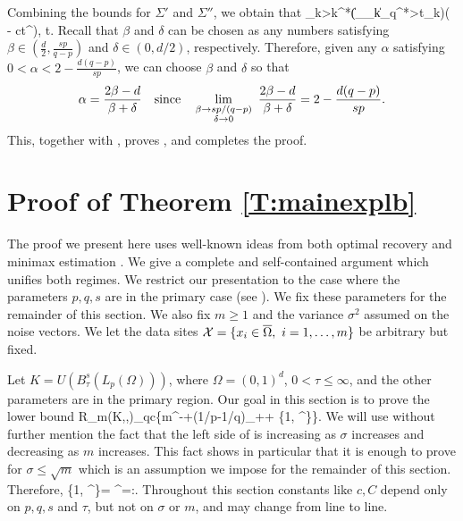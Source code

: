 Combining the bounds 
 for $\Sigma'$ and $\Sigma''$, we obtain that 
\be
\label{sigma2}
\sum_{k>k^*}(\|\eta_{\lambda_k}\|_q^*>t_k\e)( - ct^{}), \quad t.
\ee
Recall that $\beta$ and $\delta$ can be chosen as any numbers satisfying 
$\beta\in (\frac{d}{2},\frac{sp}{q-p})$ and  
  $\delta\in (0,d/2)$, respectively.    Therefore, given any 
 $\alpha$ satisfying
 $0<\alpha<2-\frac{d(q-p)}{sp}$, we   can choose $\beta$ and 
$\delta$ so that 
\begin{equation}
 \alpha= \frac{2\beta  -d}{\beta+\delta}%
 \quad 
 \hbox{since}
 \quad 
 \lim_{\substack{\beta\to sp/(q-p)\\\delta\to 0}}\,\, \frac{2\beta  -d}{\beta+\delta}=2-\frac{d(q-p)}{sp}.
\end{equation}
 This, together with  , proves  ,  and completes the proof.


\section{Proof of Theorem \ref{T:mainexplb} }
\label{S:lowerbounds}
 

The proof we present here uses well-known ideas from both optimal recovery \cite{BDPS,NT,V, KNS} and minimax estimation \cite{barron1999risk,yang1999information,DJ}. We give a complete and self-contained argument which unifies both regimes. We restrict our presentation to the case where the parameters $p,q,s$ are in the primary case (see ). We fix these parameters for the remainder of this section. We also fix $m\ge 1$ and the variance $\sigma^2$ assumed on the noise vectors. 
We let the data sites ${\cal X}=\{x_i\in\overline \Omega, \ i=1,\dots,m\}$ be arbitrary but fixed. 

Let $K=U(B_\tau^s(L_p(\Omega)))$, where $\Omega=(0,1)^d$, $0<\tau\le \infty$, and   the other parameters are in the primary region.  
Our goal in this section is to prove the lower bound
\be 
\label{goal2}
R_m(K,\sigma,\cX)_q\ge c\left\{m^{-+(1/p-1/q)_+}+
\min\left\{1, ^{}\right\}\right\}.
\ee 
  We will use without further mention the fact that
the left side of  is increasing as $\sigma$ increases and decreasing as $m$ increases. This fact shows in particular that it is enough to prove  for $\sigma\le\sqrt{m}$ which is an assumption we impose for the remainder of this section. 
Therefore,
\be 
\label{epsagain}
\min\left\{1, ^{}\right\}= ^{}=:\e.
\ee 
Throughout this section constants like $c,C$ depend 
only on $p,q,s$ and $\tau$,  but not on $\sigma$ or $m$, and may change from line to line.




